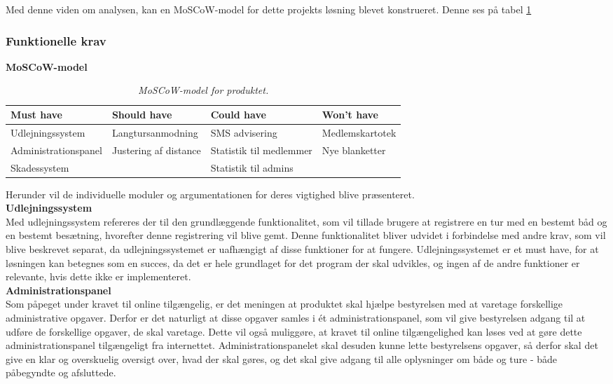 Med denne viden om analysen, kan en MoSCoW-model for dette projekts løsning blevet konstrueret. Denne ses på tabel \ref{tab:moscow}

\subsubsection{Funktionelle krav}

\textbf{MoSCoW-model}\\
\begin{table}[H]
    \begin{tabularx}{\textwidth}{l|l|l|X}
    \textbf{Must have} & \textbf{Should have} & \textbf{Could have} & \textbf{Won't have}\\ \hline \hline
    
    Udlejningssystem & Langtursanmodning & SMS advisering & Medlemskartotek\\ \hline
    Administrationspanel & Justering af distance  & Statistik til medlemmer   &   Nye blanketter\\ \hline
    Skadessystem & ~ & Statistik til admins & ~\\
    \end{tabularx}
    \caption{\textit{MoSCoW-model for produktet. \tabelgroup}}
    \label{tab:moscow}
\end{table}

Herunder vil de individuelle moduler og argumentationen for deres vigtighed blive præsenteret.\\

\textbf{Udlejningssystem}\\
Med udlejningssystem refereres der til den grundlæggende funktionalitet, som vil tillade brugere at registrere en tur med en bestemt båd og en bestemt besætning, hvorefter denne registrering vil blive gemt. Denne funktionalitet bliver udvidet i forbindelse med andre krav, som vil blive beskrevet separat, da udlejningssystemet er uafhængigt af disse funktioner for at fungere.
Udlejningssystemet er et must have, for at løsningen kan betegnes som en succes, da det er hele grundlaget for det program der skal udvikles, og ingen af de andre funktioner er relevante, hvis dette ikke er implementeret.\\

\textbf{Administrationspanel}\\
Som påpeget under kravet til online tilgængelig, er det meningen at produktet skal hjælpe bestyrelsen med at varetage forskellige administrative opgaver. Derfor er det naturligt at disse opgaver samles i ét administrationspanel, som vil give bestyrelsen adgang til at udføre de forskellige opgaver, de skal varetage. Dette vil også muliggøre, at kravet til online tilgængelighed kan løses ved at gøre dette administrationspanel tilgængeligt fra internettet. Administrationspanelet skal desuden kunne lette bestyrelsens opgaver, så derfor skal det give en klar og overskuelig oversigt over, hvad der skal gøres, og det skal give adgang til alle oplysninger om både og ture - både påbegyndte og afsluttede.\\

